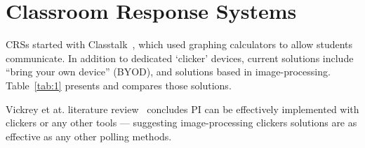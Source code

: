 \section{Classroom Response Systems} \label{sec:crs}

CRSs started with Classtalk~\cite{beatty2005transforming}, which used graphing calculators to allow students communicate. In addition to dedicated ‘clicker’ devices, current solutions include “bring your own device” (BYOD), and solutions based in image-processing. Table~\ref{tab:1} presents and compares those solutions.

Vickrey et at. literature review~\cite{vickrey2015PI} concludes PI can be effectively implemented with clickers or any other tools --- suggesting image-processing clickers solutions are as effective as any other polling methods.


